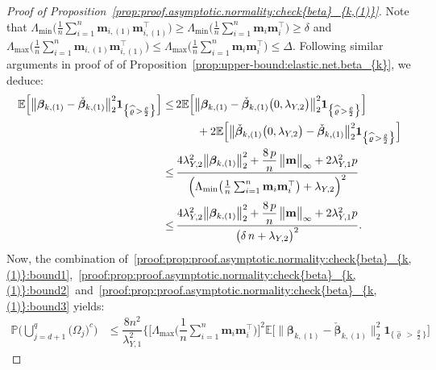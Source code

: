 \documentclass[
  12pt]{article}
\def\E{\mathbb{E}}
\def\M{\mathbf{m}}
\begin{document}
\begin{proof}[Proof of Proposition~\ref{prop:proof.asymptotic.normality:check{beta}_{k,(1)}}]
	Note that $\Lambda_{\min} \Big( \frac{1}{n} \sum_{i=1}^{n} \M_{i,(1)} \M_{i,(1)}^{\top} \Big) \geq \Lambda_{\min} \Big( \frac{1}{n} \sum_{i=1}^{n} \M_{i} \M_{i}^{\top} \Big) \geq \delta$ 
	and $\Lambda_{\max} \Big( \frac{1}{n} \sum_{i=1}^{n} \M_{i,(1)} \M_{i,(1)}^{\top} \Big) \leq \Lambda_{\max} \Big( \frac{1}{n} \sum_{i=1}^{n} \M_{i} \M_{i}^{\top} \Big) \leq \Delta$. Following similar arguments in proof of  of Proposition~\ref{prop:upper-bound:elastic.net.beta_{k}}, we deduce:  
	\begin{align}
		\E \Big[ \big\|  \bm{\beta}_{k,(1)}  - \check{\bm{\beta}}_{k,(1)}  \big\|_{2}^{2}   \mathbf{1}_{ \big\{ \widehat{ \varrho } \, > \frac{\varrho}{2} \big\} }   \Big]  
		\leq & \,  2 \E \Big[ \big\|  \bm{\beta}_{k,(1)}  - \check{\bm{\beta}}_{k,(1)} \big( 0 , \lambda_{Y,2} \big) \big\|_{2}^{2}   \mathbf{1}_{ \big\{ \widehat{ \varrho } \, > \frac{\varrho}{2} \big\} }   \Big]   \nonumber  
		\\
		& \qquad  +  2  \E \Big[ \big\|  \check{\bm{\beta}}_{k,(1)} \big( 0 , \lambda_{Y,2} \big)  - \check{\bm{\beta}}_{k,(1)}  \big\|_{2}^{2}   \mathbf{1}_{ \big\{ \widehat{ \varrho } \, > \frac{\varrho}{2} \big\} }   \Big]    
		\nonumber   
		\\  
		\leq & \,   \dfrac{   4  \lambda_{Y,2}^{2}   \big\| \bm{\beta}_{k,(1)}   \big\|_{2}^{2}  +    \dfrac{8 \, p}{n}  \,     \big\| \M \big\|_{\infty} 
			+  2 \lambda_{Y,1}^{2} p 
		}{ \Big(  \Lambda_{\min} \big( \frac{1}{n} \sum_{i=1}^{n} \M_{i} \M_{i}^{\top} \big)  +   \lambda_{Y,2}  \Big)^{2} }
		\nonumber   
		\\
		\leq  &  \,  
		\dfrac{ 4  \lambda_{Y,2}^{2}   \big\| \bm{\beta}_{k,(1)}   \big\|_{2}^{2}  +    \dfrac{8 \, p}{n}  \,    \big\| \M \big\|_{\infty} 
			+  2 \lambda_{Y,1}^{2} p  
		}{ \big(  \delta \, n   +   \lambda_{Y,2}  \big)^{2} }
		.
		\label{proof:prop:proof.asymptotic.normality:check{beta}_{k,(1)}:bound3}
	\end{align}
	Now, the combination of~\eqref{proof:prop:proof.asymptotic.normality:check{beta}_{k,(1)}:bound1},~\eqref{proof:prop:proof.asymptotic.normality:check{beta}_{k,(1)}:bound2}~and~\eqref{proof:prop:proof.asymptotic.normality:check{beta}_{k,(1)}:bound3} yields:  
	\begin{align*}
		\mathbb{P} \Bigg(  \bigcup_{j = d+1}^{q} 
		\big( \Omega_{j} \big)^{c} \Bigg)  &\leq 
		\dfrac{8 n^{2}}{\lambda_{Y,1}^{2}}   \Bigg \{  \Big[  \Lambda_{\max} \Big( \dfrac{1}{n}   \sum_{i = 1}^{n}  \M_{i} \M_{i}^{\top}  \Big) \Big]^{2}   \E \Big[ \big\|  \bm{\beta}_{k,(1)}  - \check{\bm{\beta}}_{k,(1)}  \big\|_{2}^{2}   \mathbf{1}_{ \big\{ \widehat{ \varrho } \, > \frac{\varrho}{2} \big\} }   \Big]

\end{align*}
\end{proof}
\end{document}
